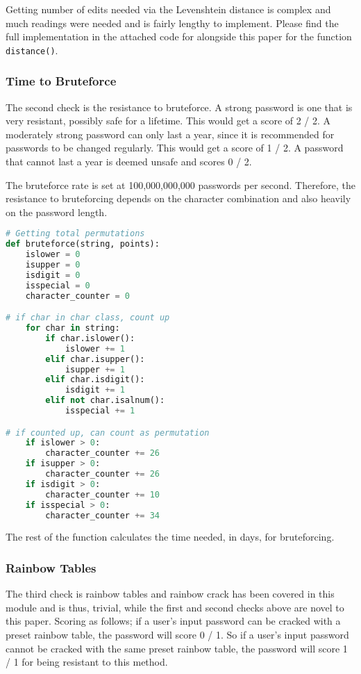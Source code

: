 \documentclass[letterpaper,twocolumn,10pt]{article}
\begin{document}
Getting number of edits needed via the Levenshtein distance is complex and much readings were needed and is fairly lengthy to implement. Please find the full implementation in the attached code for alongside this paper for the function \lstinline{distance()}.

\subsubsection{Time to Bruteforce}
The second check is the resistance to bruteforce. A strong password is one that is very resistant, possibly safe for a lifetime. This would get a score of 2 / 2. A moderately strong password can only last a year, since it is recommended for passwords to be changed regularly\cite{changepwd}. This would get a score of 1 / 2. A password that cannot last a year is deemed unsafe and scores 0 / 2. 

The bruteforce rate is set at 100,000,000,000 passwords per second\cite{bruteforce}. Therefore, the resistance to bruteforcing depends on the character combination and also heavily on the password length.

\begin{lstlisting}[language=python, frame=none]
# Getting total permutations
def bruteforce(string, points):
    islower = 0
    isupper = 0
    isdigit = 0
    isspecial = 0
    character_counter = 0   

# if char in char class, count up
    for char in string:
        if char.islower():
            islower += 1
        elif char.isupper():
            isupper += 1
        elif char.isdigit():
            isdigit += 1
        elif not char.isalnum():
            isspecial += 1  

# if counted up, can count as permutation
    if islower > 0:
        character_counter += 26
    if isupper > 0:
        character_counter += 26
    if isdigit > 0:
        character_counter += 10
    if isspecial > 0:
        character_counter += 34
\end{lstlisting}

The rest of the function calculates the time needed, in days, for bruteforcing.

\subsubsection{Rainbow Tables}
The third check is rainbow tables and rainbow crack has been covered in this module and is thus, trivial, while the first and second checks above are novel to this paper. Scoring as follows; if a user's input password can be cracked with a preset rainbow table, the password will score 0 / 1. So if a user's input password cannot be cracked with the same preset rainbow table, the password will score 1 / 1 for being resistant to this method.
\end{document}
